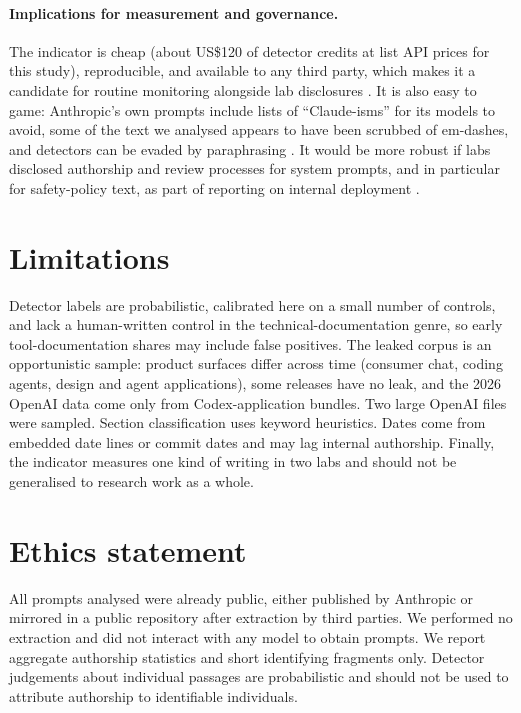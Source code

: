 \documentclass[11pt]{article}
\begin{document}
\paragraph{Implications for measurement and governance.} The indicator is cheap (about US\$120 of detector credits at list API prices for this study), reproducible, and available to any third party, which makes it a candidate for routine monitoring alongside lab disclosures \citep{chan2026measuring,brundage2026auditing}. It is also easy to game: Anthropic's own prompts include lists of ``Claude-isms'' for its models to avoid, some of the text we analysed appears to have been scrubbed of em-dashes, and detectors can be evaded by paraphrasing \citep{sadasivan2023detect}. It would be more robust if labs disclosed authorship and review processes for system prompts, and in particular for safety-policy text, as part of reporting on internal deployment \citep{kwon2026internal,stix2025closed}.

\section{Limitations}

Detector labels are probabilistic, calibrated here on a small number of controls, and lack a human-written control in the technical-documentation genre, so early tool-documentation shares may include false positives. The leaked corpus is an opportunistic sample: product surfaces differ across time (consumer chat, coding agents, design and agent applications), some releases have no leak, and the 2026 OpenAI data come only from Codex-application bundles. Two large OpenAI files were sampled. Section classification uses keyword heuristics. Dates come from embedded date lines or commit dates and may lag internal authorship. Finally, the indicator measures one kind of writing in two labs and should not be generalised to research work as a whole.

\section{Ethics statement}

All prompts analysed were already public, either published by Anthropic or mirrored in a public repository after extraction by third parties. We performed no extraction and did not interact with any model to obtain prompts. We report aggregate authorship statistics and short identifying fragments only. Detector judgements about individual passages are probabilistic and should not be used to attribute authorship to identifiable individuals.
\end{document}
